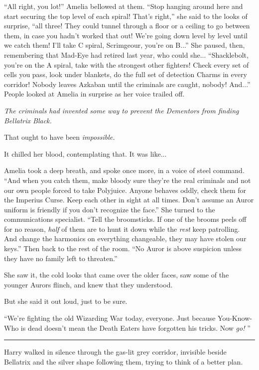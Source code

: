 ``All right, you lot!'' Amelia bellowed at them. ``Stop hanging around
here and start securing the top level of each spiral! That's right,''
she said to the looks of surprise, ``all three! They could tunnel
through a floor or a ceiling to go between them, in case you hadn't
worked that out! We're going down level by level until we catch them!
I'll take C spiral, Scrimgeour, you're on B...'' She paused, then,
remembering that Mad-Eye had retired last year, who could she...
``Shacklebolt, you're on the A spiral, take with the strongest other
fighters! Check every set of cells you pass, look under blankets, do the
full set of detection Charms in every corridor! Nobody leaves Azkaban
until the criminals are caught, nobody! And...'' People looked at
Amelia in surprise as her voice trailed off.

\emph{The criminals had invented some way to prevent the Dementors from
finding Bellatrix Black.}

That ought to have been \emph{impossible.}

It chilled her blood, contemplating that. It was like...

Amelia took a deep breath, and spoke once more, in a voice of steel
command. ``And when you catch them, make bloody sure they're the real
criminals and not our own people forced to take Polyjuice. Anyone
behaves oddly, check them for the Imperius Curse. Keep each other in
sight at all times. Don't assume an Auror uniform is friendly if you
don't recognize the face.'' She turned to the communications specialist.
``Tell the broomsticks. If one of the brooms peels off for no reason,
\emph{half} of them are to hunt it down while the \emph{rest} keep
patrolling. And change the harmonics on everything changeable, they may
have stolen our keys.'' Then back to the rest of the room. ``No Auror is
above suspicion unless they have no family left to threaten.''

She saw it, the cold looks that came over the older faces, saw some of
the younger Aurors flinch, and knew that they understood.

But she said it out loud, just to be sure.

``We're fighting the old Wizarding War today, everyone. Just because
You-Know-Who is dead doesn't mean the Death Eaters have forgotten his
tricks. Now \emph{go!} ''

\begin{center}\rule{3in}{0.4pt}\end{center}

Harry walked in silence through the gas-lit grey corridor, invisible
beside Bellatrix and the silver shape following them, trying to think of
a better plan.

